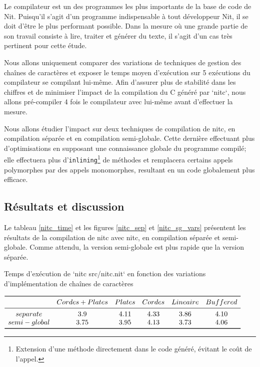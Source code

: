 Le compilateur est un des programmes les plus importants de la base de code de Nit.
Puisqu'il s'agit d'un programme indispensable à tout développeur Nit, il se doit
d'être le plus performant possible.
Dans la mesure où une grande partie de son travail consiste à lire, traiter et générer
du texte, il s'agit d'un cas très pertinent pour cette étude.

Nous allons uniquement comparer des variations de techniques de gestion des chaînes
de caractères et exposer le temps moyen d'exécution sur 5 exécutions du compilateur
se compilant lui-même.
Afin d'assurer plus de stabilité dans les chiffres et de minimiser l'impact de la
compilation du C généré par `nitc`, nous allons pré-compiler 4 fois le compilateur
avec lui-même avant d'effectuer la mesure.

Nous allons étudier l'impact sur deux techniques de compilation de nitc, en compilation
séparée et en compilation semi-globale.
Cette dernière effectuant plus d'optimisations en supposant une connaissance globale
du programme compilé; elle effectuera plus
d'\texttt{inlining}\footnote{Extension d'une méthode directement dans le code généré, évitant le coût de l'appel.}
de méthodes et remplacera
certains appels polymorphes par des appels monomorphes, resultant en un code globalement
plus efficace.

\subsection{Résultats et discussion}

Le tableau \ref{nitc_time} et les figures \ref{nitc_sep} et \ref{nitc_sg_vars} présentent les résultats de
la compilation de nitc avec nitc, en compilation séparée et semi-globale.
Comme attendu, la version semi-globale est plus rapide que la version
séparée.

\begin{table}
	\caption{\label{nitc_time}Temps d'exécution de `nitc src/nitc.nit` en fonction des variations d'implémentation de chaînes de caractères}
	\centering
	$\begin{array}{ *{6}{c} }
		\toprule
		 & Cordes + Plates & Plates & Cordes & Lineaire & Buffered \\
		\midrule
		separate & 3.9 & 4.11 & 4.33 & 3.86 & 4.10\\
		semi-global & 3.75 & 3.95 & 4.13 & 3.73 & 4.06\\
		\bottomrule
	\end{array}$
\end{table}

